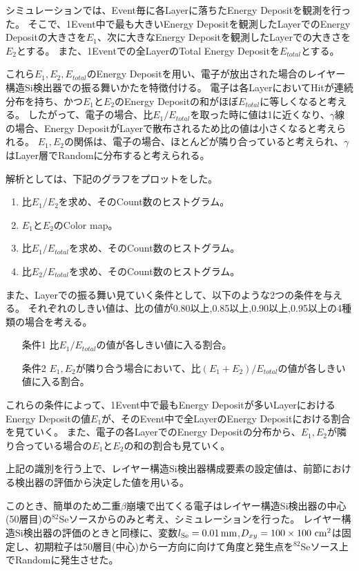 \documentclass[a4paper,10pt]{jreport}
\begin{document}
シミュレーションでは、Event毎に各Layerに落ちたEnergy Depositを観測を行った。
そこで、1Event中で最も大きいEnergy Depositを観測したLayerでのEnergy Depositの大きさを$E_1$、次に大きなEnergy Depositを観測したLayerでの大きさを$E_2$とする。
また、1Eventでの全LayerのTotal Energy Depositを$E_{total}$とする。

これら$E_1,E_2,E_{total}$のEnergy Depositを用い、電子が放出された場合のレイヤー構造Si検出器での振る舞いかたを特徴付ける。
電子は各LayerにおいてHitが連続分布を持ち、かつ$E_1$と$E_2$のEnergy Depositの和がほぼ$E_{total}$に等しくなると考える。
したがって、電子の場合、比$E_1/E_{total}$を取った時に値は1に近くなり、$\gamma$線の場合、Energy DepositがLayerで散布されるため比の値は小さくなると考えられる。
$E_1,E_2$の関係は、電子の場合、ほとんどが隣り合っていると考えられ、$\gamma$はLayer層でRandomに分布すると考えられる。

解析としては、下記のグラフをプロットをした。

\begin{enumerate}
	\item 比$E_1/E_2$を求め、そのCount数のヒストグラム。
	\item $E_1$と$E_2$のColor map。
	\item 比$E_1/E_{total}$を求め、そのCount数のヒストグラム。
	\item 比$E_2/E_{total}$を求め、そのCount数のヒストグラム。
\end{enumerate}

また、Layerでの振る舞い見ていく条件として、以下のような2つの条件を与える。
それぞれのしきい値は、比の値が0.80以上,0.85以上,0.90以上,0.95以上の4種類の場合を考える。

\begin{enumerate}
	\item[条件1] 比$E_1/E_{total}$の値が各しきい値に入る割合。
	\item[条件2] $E_1,E_2$が隣り合う場合において、比$(E_1+E_2)/E_{total}$の値が各しきい値に入る割合。
\end{enumerate}

これらの条件によって、1Event中で最もEnergy Depositが多いLayerにおけるEnergy Depositの値$E_1$が、そのEvent中で全LayerのEnergy Depositにおける割合を見ていく。
また、電子の各LayerでのEnergy Depositの分布から、$E_1,E_2$が隣り合っている場合の$E_1$と$E_2$の和の割合も見ていく。

上記の識別を行う上で、レイヤー構造Si検出器構成要素の設定値は、前節における検出器の評価から決定した値を用いる。

このとき、簡単のため二重$\beta$崩壊で出てくる電子はレイヤー構造Si検出器の中心(50層目)の$^{82}$Seソースからのみと考え、シミュレーションを行った。
レイヤー構造Si検出器の評価のときと同様に、変数$l_{\rm{Se}} = \SI{0.01}{mm}$,$D_{xy} =100\times100\ \rm{cm}^2$は固定し、初期粒子は50層目(中心)から一方向に向けて角度と発生点を$^{82}$Seソース上でRandomに発生させた。
\end{document}
